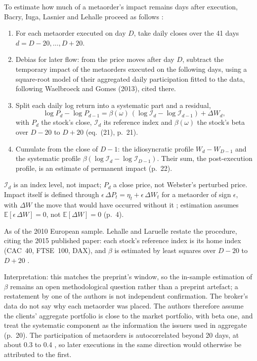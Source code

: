 \begin{qfmethod}\label{meth:post-execution-impact-profile}
 To estimate how much of a metaorder's impact remains days after execution, Bacry, Iuga, Lasnier and Lehalle proceed as follows \citep[arXiv preprint of 9 Dec.\ 2014, sec.~7.2, pp.~20--22]{wide-bacry-life-cycle}:
\begin{enumerate}
\item For each metaorder executed on day $D$, take daily closes over the 41 days $d=D-20,\dots,D+20$.
\item Debias for later flow: from the price moves after day $D$, subtract the temporary impact of the metaorders executed on the following days, using a square-root model of their aggregated daily participation fitted to the data, following Waelbroeck and Gomes (2013), cited there.
\item Split each daily log return into a systematic part and a residual,
\[ \log P_d-\log P_{d-1}=\beta(\omega)\,(\log\mathcal I_d-\log\mathcal I_{d-1})+\Delta W_d, \]
with $P_d$ the stock's close, $\mathcal I_d$ its reference index and $\beta(\omega)$ the stock's beta over $D-20$ to $D+20$ (eq.~(21), p.~21).
\item Cumulate from the close of $D-1$: the idiosyncratic profile $W_d-W_{D-1}$ and the systematic profile $\beta(\log\mathcal I_d-\log\mathcal I_{D-1})$. Their sum, the post-execution profile, is an estimate of permanent impact (p.~22).
\end{enumerate}

 $\mathcal I_d$ is an index level, not impact; $P_d$ a close price, not Webster's perturbed price. Impact itself is defined through $\epsilon\,\Delta P_t=\eta_t+\epsilon\,\Delta W_t$ for a metaorder of sign $\epsilon$, with $\Delta W$ the move that would have occurred without it \citep[arXiv preprint, sec.~2.2, eq.~(1), p.~3]{wide-bacry-life-cycle}; estimation assumes $\mathbb E[\epsilon\,\Delta W]=0$, not $\mathbb E[\Delta W]=0$ (p.~4).

 As of the 2010 European sample. Lehalle and Laruelle restate the procedure, citing the 2015 published paper: each stock's reference index is its home index (CAC~40, FTSE~100, DAX), and $\beta$ is estimated by least squares over $D-20$ to $D+20$ \citep[chap.~3, sec.~3.2.2, eq.~(3.2), pp.~210 and~213--215]{alpha-laruelle}.

Interpretation: this matches the preprint's window, so the in-sample estimation of $\beta$ remains an open methodological question rather than a preprint artefact; a restatement by one of the authors is not independent confirmation. The broker's data do not say why each metaorder was placed. The authors therefore assume the clients' aggregate portfolio is close to the market portfolio, with beta one, and treat the systematic component as the information the issuers used in aggregate (p.~20). The participation of metaorders is autocorrelated beyond 20 days, at about 0.3 to 0.4 \citep[same sec., Figure~10, p.~21]{wide-bacry-life-cycle}, so later executions in the same direction would otherwise be attributed to the first.


\end{qfmethod}
